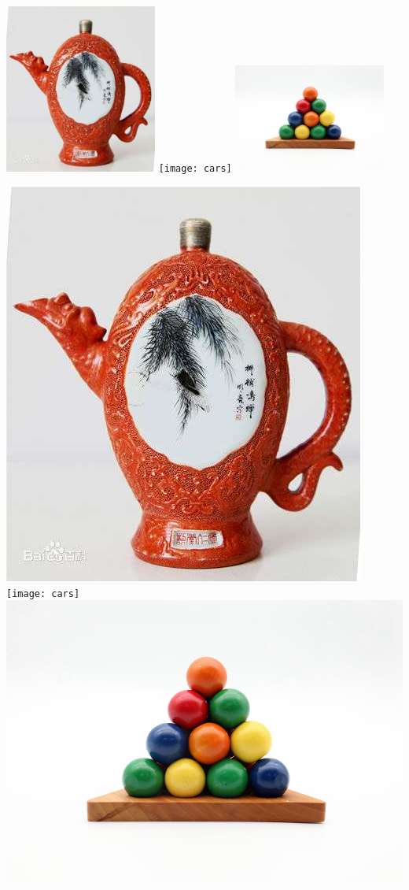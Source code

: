 \documentclass{ctexart}
\begin{document}
\includegraphics[width=5cm]{bottle}
\texttt{[image: cars]}
\includegraphics[width=5cm]{balls}

\includegraphics[height=0.1\textheight]{bottle}
\texttt{[image: cars]}
\includegraphics[height=0.1\textheight]{balls}
\end{document}
